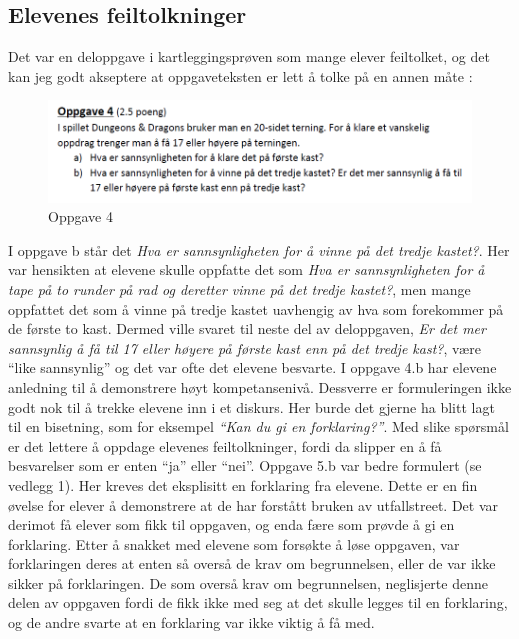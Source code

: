 \documentclass[main.tex]{subfiles}
\begin{document}
\subsection*{Elevenes feiltolkninger}
Det var en deloppgave i kartleggingsprøven som mange elever feiltolket, og det kan jeg godt
akseptere at oppgaveteksten er lett å tolke på en annen måte :
\par
\begin{figure}[h!]
\centering
\includegraphics[scale = 0.7]{../figures/oppgave4b.png}
\caption{Oppgave 4}
\label{fig:oppgave4}
\end{figure}
I oppgave b står det \emph{Hva er sannsynligheten for å vinne på det tredje kastet?}. Her var hensikten at
elevene skulle oppfatte det som \emph{Hva er sannsynligheten for å tape på to runder på rad og deretter vinne på 
det tredje kastet?}, men mange oppfattet det som å vinne på tredje kastet uavhengig av hva som forekommer på de 
første to kast. Dermed ville svaret til neste del av deloppgaven, \emph{Er det mer sannsynlig å få til 17 eller 
høyere på første kast enn på det tredje kast?},  være ``like sannsynlig'' og det var ofte det elevene besvarte. 
I oppgave 4.b har elevene anledning til å demonstrere høyt kompetansenivå. Dessverre er formuleringen ikke
godt nok til å trekke elevene inn i et diskurs. Her burde det gjerne ha blitt lagt til en bisetning, som 
for eksempel \emph{``Kan du gi en forklaring?''}. Med slike spørsmål er det lettere å oppdage elevenes
feiltolkninger, fordi da slipper en å få besvarelser som er enten ``ja'' eller ``nei''. Oppgave 
5.b var bedre formulert (se vedlegg 1). Her kreves det eksplisitt en forklaring fra elevene.
Dette er en fin øvelse for elever å demonstrere at de har forstått bruken av utfallstreet. Det var derimot
få elever som fikk til oppgaven, og enda fære som prøvde å gi en forklaring. Etter å snakket med elevene
som forsøkte å løse oppgaven, var forklaringen deres at enten så overså de krav om begrunnelsen, eller de var
ikke sikker på forklaringen. De som overså krav om begrunnelsen, neglisjerte denne delen av oppgaven fordi
de fikk ikke med seg at det skulle legges til en forklaring, og de andre svarte at en forklaring var ikke
viktig å få med. 
\end{document}
